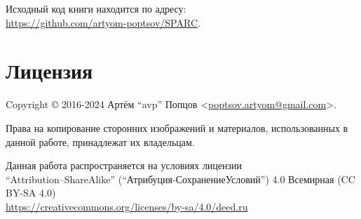 \documentclass[../sparc.tex]{subfiles}
\begin{document}
Исходный код книги находится по адресу: \\
\url{https://github.com/artyom-poptsov/SPARC}.

\section*{Лицензия}

Copyright © 2016-2024 Артём ``avp'' Попцов <\href{mailto:poptsov.artyom@gmail.com}{poptsov.artyom@gmail.com}>.

Права на копирование сторонних изображений и материалов, использованных в данной
работе, принадлежат их владельцам.

Данная работа распространяется на условиях лицензии
\\ ``Attribution--ShareAlike'' (``Атрибуция-СохранениеУсловий'') 4.0 Всемирная
(CC BY-SA 4.0) \\ \url{https://creativecommons.org/licenses/by-sa/4.0/deed.ru}
\end{document}
